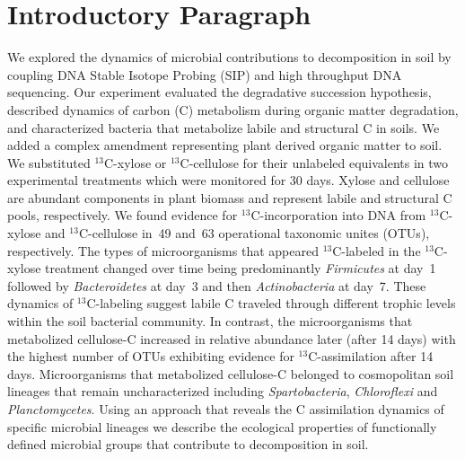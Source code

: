 \section{Introductory Paragraph} We explored the dynamics of microbial contributions to
decomposition in soil by coupling DNA Stable Isotope Probing (SIP) and high
throughput DNA sequencing. Our experiment evaluated the degradative succession
hypothesis, described dynamics of carbon (C) metabolism during organic matter
degradation, and characterized bacteria that metabolize labile and structural
C in soils. We added a complex amendment representing plant derived organic
matter to soil. We substituted $^{13}$C-xylose or $^{13}$C-cellulose for their
unlabeled equivalents in two experimental treatments which were monitored for
30 days.  Xylose and cellulose are abundant components in plant biomass and
represent labile and structural C pools, respectively. We found evidence for
$^{13}$C-incorporation into DNA from $^{13}$C-xylose and $^{13}$C-cellulose
in~49 and~63 operational taxonomic unites (OTUs), respectively. The types of
microorganisms that appeared $^{13}$C-labeled in the $^{13}$C-xylose treatment
changed over time being predominantly \textit{Firmicutes} at day~1 followed by
\textit{Bacteroidetes} at day~3 and then \textit{Actinobacteria} at day~7.
These dynamics of $^{13}$C-labeling suggest labile C traveled through different
trophic levels within the soil bacterial community. In contrast, the
microorganisms that metabolized cellulose-C increased in relative abundance
later (after 14 days) with the highest number of OTUs exhibiting evidence for
$^{13}$C-assimilation after 14 days. Microorganisms that metabolized
cellulose-C belonged to cosmopolitan soil lineages that remain uncharacterized
including \textit{Spartobacteria}, \textit{Chloroflexi} and
\textit{Planctomycetes}.  Using an approach that reveals the C assimilation
dynamics of specific microbial lineages we describe the ecological properties
of functionally defined microbial groups that contribute to decomposition in
soil.

